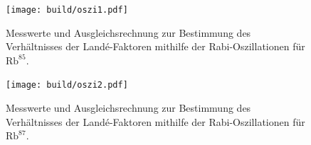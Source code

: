 \begin{figure}
  \centering
  \texttt{[image: build/oszi1.pdf]}
  \caption{Messwerte und Ausgleichsrechnung zur Bestimmung des Verhältnisses der Landé-Faktoren mithilfe der
  Rabi-Oszillationen für $\text{Rb}^{85}$.}
  \label{fig:oszi1}
\end{figure}
\begin{figure}
  \centering
  \texttt{[image: build/oszi2.pdf]}
  \caption{Messwerte und Ausgleichsrechnung zur Bestimmung des Verhältnisses der Landé-Faktoren mithilfe der
  Rabi-Oszillationen für $\text{Rb}^{87}$.}
  \label{fig:oszi2}
\end{figure}
